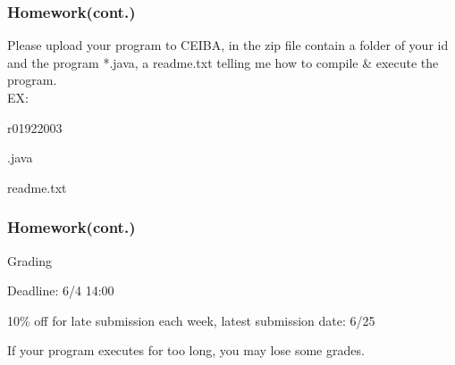 \documentclass[12pt]{beamer}
\begin{document}
\begin{frame}
  \frametitle{Homework(cont.)}
  Please upload your program to CEIBA, in the zip file contain a folder of your id and the program *.java, a readme.txt telling me how to compile \& execute the program.\\
  EX:\\
  \begin{itemize}
    {\item r01922003}
          \begin{itemize}
            {\item *.java}
            {\item readme.txt}
          \end{itemize}
  \end{itemize}
\end{frame}

\begin{frame}
  \frametitle{Homework(cont.)}
  Grading
  \begin{itemize}
    {\item Deadline: 6/4 14:00}
    {\item 10\% off for late submission each week, latest submission date: 6/25}
    {\item If your program executes for too long, you may lose some grades.}
  \end{itemize}
\end{frame}
\end{document}
